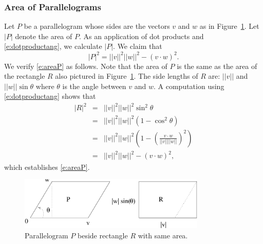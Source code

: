 \documentclass{ximera}
\begin{document}
\subsubsection{Area of Parallelograms}

Let $P$ be a parallelogram whose sides are the vectors $v$ and $w$ as
in Figure~\ref{F:parallel}.  Let $|P|$ denote the area of $P$.  As an
application of dot products  and
\eqref{e:dotproductang}, we calculate $|P|$. 
We claim that
\begin{equation}  \label{e:areaP}
|P|^2 = ||v||^2||w||^2 - (v\cdot w)^2.
\end{equation}
We verify \eqref{e:areaP} as follows.  Note that the area of $P$
is the same as the area of the rectangle $R$ also pictured in
Figure~\ref{F:parallel}.  The side lengths of $R$ are: $||v||$ and
$||w||\sin\theta$ where $\theta$ is the angle between $v$ and $w$.
A computation using \eqref{e:dotproductang} shows that
\begin{eqnarray*}
|R|^2 & = & ||v||^2 ||w||^2\sin^2\theta \\
& = & ||v||^2 ||w||^2(1-\cos^2\theta) \\
& = & ||v||^2 ||w||^2\left(1-\left(\frac{v\cdot w}{||v|| ||w||}
\right)^2\right)\\
& = & ||v||^2 ||w||^2 - (v\cdot w)^2,
\end{eqnarray*}
which establishes \eqref{e:areaP}.

\begin{figure}[htb]
     \centerline{%
     \includegraphics[width=3.5in]{../figures/parallel.pdf}}
     \caption{Parallelogram $P$ beside rectangle $R$ with same area.}
     \label{F:parallel}
\end{figure}




\end{document}
